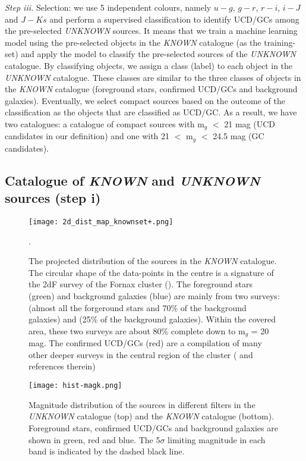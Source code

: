 \documentclass[fleqn,usenatbib]{mnras}
\begin{document}
\textit{Step iii.} Selection: we use 5 independent colours, namely $u-g$, $g-r$, $r-i$, $i-J$ and $J-Ks$ and perform a supervised classification to identify UCD/GCs among the pre-selected \textit{UNKNOWN} sources. It means that we train a machine learning model using the pre-selected objects in the \textit{KNOWN} catalogue (as the training-set) and apply the model to classify the pre-selected sources of the \textit{UNKNOWN} catalogue. By classifying objects, we assign a class (label) to each object in the \textit{UNKNOWN} catalogue. These classes are similar to the three classes of objects in the \textit{KNOWN} catalogue (foreground stars, confirmed UCD/GCs and background galaxies). Eventually, we select compact sources based on the outcome of the classification as the objects that are classified as UCD/GC. As a result, we have two catalogues: a catalogue of compact sources with m$_g$ $<$ 21 mag (UCD candidates in our definition) and one with 21 $<$ m$_g$ $<$ 24.5 mag (GC candidates).

\subsection{Catalogue of \textit{KNOWN} and \textit{UNKNOWN} sources (step i)}

\begin{figure}
\centering
        \texttt{[image: 2d\_dist\_map\_knownset+.png]}
\caption{The projected distribution of the sources in the \textit{KNOWN} catalogue. The circular shape of the data-points in the centre is a signature of the 2dF survey of the Fornax cluster (\citealp{drinkwater2000}). The foreground stars (green) and background galaxies (blue) are mainly from two surveys: \citet{drinkwater2000} (almost all the forgeround stars and 70\% of the background galaxies) and \citet{Maddox-2019} (25\% of the background galaxies). Within the covered area, these two surveys are about 80\% complete down to m$_g$ = 20 mag. The confirmed UCD/GCs (red) are a compilation of many other deeper surveys in the central region of the cluster (\citealp{wittmann-2016,Pota-2018} and references therein)}.
\label{knowndist}
\end{figure} 

\begin{figure*}
        \texttt{[image: hist-magk.png]}
\caption{Magnitude distribution of the sources in different filters in the \textit{UNKNOWN} catalogue (top) and the \textit{KNOWN} catalogue (bottom). Foreground stars, confirmed UCD/GCs and background galaxies are shown in green, red and blue. The 5$\sigma$ limiting magnitude in each band is indicated by the dashed black line. }
\label{hist-mag}
\end{figure*}
\end{document}
